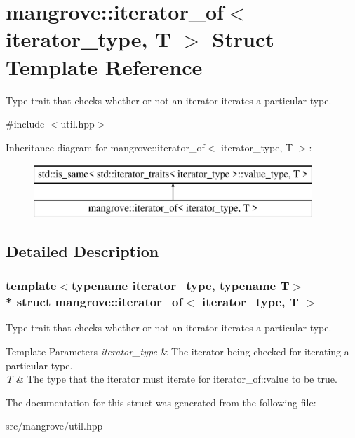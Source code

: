 \hypertarget{structmangrove_1_1iterator__of}{}\section{mangrove\+:\+:iterator\+\_\+of$<$ iterator\+\_\+type, T $>$ Struct Template Reference}
\label{structmangrove_1_1iterator__of}


Type trait that checks whether or not an iterator iterates a particular type.  




{\ttfamily \#include $<$util.\+hpp$>$}

Inheritance diagram for mangrove\+:\+:iterator\+\_\+of$<$ iterator\+\_\+type, T $>$\+:\begin{figure}[H]
\begin{center}
\leavevmode
\includegraphics[height=2.000000cm]{structmangrove_1_1iterator__of}
\end{center}
\end{figure}


\subsection{Detailed Description}
\subsubsection*{template$<$typename iterator\+\_\+type, typename T$>$\\*
struct mangrove\+::iterator\+\_\+of$<$ iterator\+\_\+type, T $>$}

Type trait that checks whether or not an iterator iterates a particular type. 


\begin{DoxyTemplParams}{Template Parameters}
{\em iterator\+\_\+type} & The iterator being checked for iterating a particular type. \\
\hline
{\em T} & The type that the iterator must iterate for iterator\+\_\+of\+::value to be true. \\
\hline
\end{DoxyTemplParams}


The documentation for this struct was generated from the following file\+:\begin{DoxyCompactItemize}
\item 
src/mangrove/util.\+hpp\end{DoxyCompactItemize}
